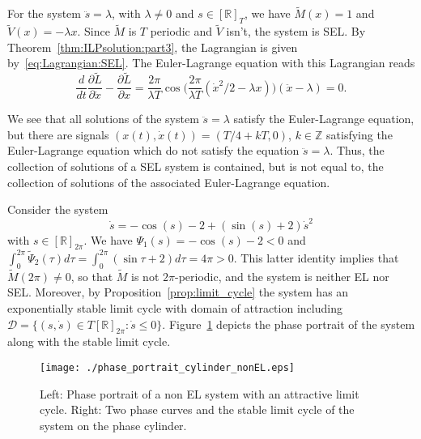 \begin{example}\label{ex:SEL_contained}
	For the system $\ddot{s}=\lambda$, with $\lambda \neq 0$ and $s \in
	[\mathbb{R}]_T$, we have $\tilde{M}(x)=1$ and $\tilde{V}(x)=-\lambda x$. Since
	$\tilde M$ is $T$ periodic and $\tilde V$ isn't, the system is
	SEL. By Theorem~\ref{thm:ILPsolution:part3}, the Lagrangian is given
	by~\eqref{eq:Lagrangian:SEL}. The Euler-Lagrange equation with this
	Lagrangian reads
				\[
	{\frac{d}{dt}\frac{\partial{{\tilde{L}}}}{\partial\dot{{x}}}-
	\frac{\partial{{\tilde{L}}}}{\partial {x}}} = \frac{2\pi}{\lambda T} \cos\Big(\frac{2\pi}{\lambda T}(\dot{x}^2/2-\lambda x)\Big)(\ddot{x}-\lambda)=0.
	\]
			
	We see that all solutions of the system $\ddot s = \lambda$ satisfy
	the Euler-Lagrange equation, but there are signals $(x(t),\dot x(t)) =
	(T/4 + kT,0)$, $ k \in \mathbb{Z}$ satisfying the Euler-Lagrange equation
	which do not satisfy the equation $\ddot s=\lambda$. Thus, the
	collection of solutions of a SEL system is contained, but is not equal
	to, the collection of solutions of the associated Euler-Lagrange
	equation.
\end{example}

\begin{example} Consider the system
				\[
	\dot{s} = -\cos(s) - 2 + (\sin(s) + 2)\dot{s}^2
	\]
				with $s \in [\mathbb{R}]_{2 \pi}$. We have $\Psi_1(s) = -\cos( s) -2 <0$ and
	$\int_0^{2\pi} \tilde \Psi_2(\tau) d \tau = \int_0^{2\pi} (\sin \tau
	+2) d \tau = 4 \pi>0$. This latter identity implies that $\tilde M(2
	\pi) \neq 0$, so that $\tilde M$ is not $2 \pi$-periodic, and the
	system is neither EL nor SEL. Moreover, by
	Proposition~\ref{prop:limit_cycle} the system has an exponentially
	stable limit cycle with domain of attraction including
	$\mathcal{D}=\{(s,\dot{s})\in T [\mathbb{R}]_{2 \pi}: \dot{s}\leq
	0\}$. Figure~\ref{fig:non-EL} depicts the phase portrait of the system
	along with the stable limit cycle.
				\begin{figure}
		\label{fig:non-EL}
		\texttt{[image: ./phase\_portrait\_cylinder\_nonEL.eps]}
		\caption{Left: Phase portrait of a non EL system with an attractive
			limit cycle. Right: Two phase curves and the stable limit cycle of
			the system on the phase cylinder.}
	\end{figure}
			\end{example}

